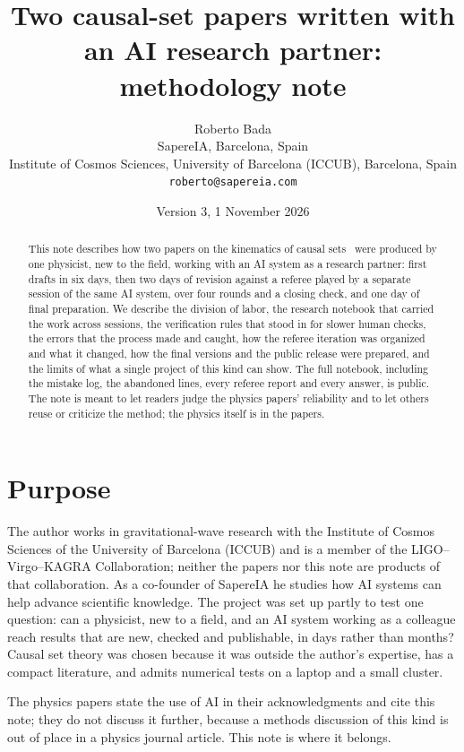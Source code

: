 \documentclass[11pt,a4paper]{article}
\title{Two causal-set papers written with an AI research partner:\\ methodology note}
\author{Roberto Bada\\ \small SapereIA, Barcelona, Spain\\ \small Institute of Cosmos Sciences, University of Barcelona (ICCUB), Barcelona, Spain\\ \small \texttt{roberto@sapereia.com}}
\date{Version 3, 1 November 2026}
\begin{document}
\maketitle

\begin{abstract}
This note describes how two papers on the kinematics of causal sets~\cite{Toolkit,Embedding} were produced by one physicist, new to the field, working with an AI system as a research partner: first drafts in six days, then two days of revision against a referee played by a separate session of the same AI system, over four rounds and a closing check, and one day of final preparation. We describe the division of labor, the research notebook that carried the work across sessions, the verification rules that stood in for slower human checks, the errors that the process made and caught, how the referee iteration was organized and what it changed, how the final versions and the public release were prepared, and the limits of what a single project of this kind can show. The full notebook, including the mistake log, the abandoned lines, every referee report and every answer, is public. The note is meant to let readers judge the physics papers' reliability and to let others reuse or criticize the method; the physics itself is in the papers.
\end{abstract}

\section{Purpose}
The author works in gravitational-wave research with the Institute of Cosmos Sciences of the University of Barcelona (ICCUB) and is a member of the LIGO--Virgo--KAGRA Collaboration; neither the papers nor this note are products of that collaboration. As a co-founder of SapereIA he studies how AI systems can help advance scientific knowledge. The project was set up partly to test one question: can a physicist, new to a field, and an AI system working as a colleague reach results that are new, checked and publishable, in days rather than months? Causal set theory was chosen because it was outside the author's expertise, has a compact literature, and admits numerical tests on a laptop and a small cluster.

The physics papers state the use of AI in their acknowledgments and cite this note; they do not discuss it further, because a methods discussion of this kind is out of place in a physics journal article. This note is where it belongs.
\end{document}
